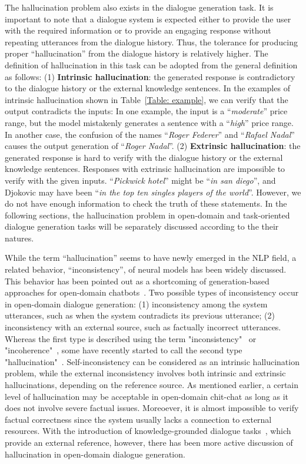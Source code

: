 The hallucination problem also exists in the dialogue generation task. It is important to note that a dialogue system is expected either to provide the user with the required information or to provide an engaging response without repeating utterances from the dialogue history. Thus, the tolerance for producing proper ``hallucination'' from the dialogue history is relatively higher.
The definition of hallucination in this task can be adopted from the general definition as follows: (1) \textbf{Intrinsic hallucination}: the generated response is contradictory to the dialogue history or the external knowledge sentences. In the examples of intrinsic hallucination shown in Table~\ref{Table: example}, we can verify that the output contradicts the inputs: In one example, the input is a ``\textit{moderate}'' price range, but the model mistakenly generates a sentence with a ``\textit{high}'' price range. In another case, the confusion of the names ``\textit{Roger Federer}'' and ``\textit{Rafael Nadal}'' causes the output generation of ``\textit{Roger Nadal}''. (2) \textbf{Extrinsic hallucination}: the generated response is hard to verify with the dialogue history or the external knowledge sentences. Responses with extrinsic hallucination are impossible to verify with the given inputs. ``\textit{Pickwick hotel}'' might be ``\textit{in san diego}'', and Djokovic may have been ``\textit{in the top ten singles players of the world}''. However, we do not have enough information to check the truth of these statements.
In the following sections, the hallucination problem in open-domain and task-oriented dialogue generation tasks will be separately discussed according to the their natures.

While the term ``hallucination'' seems to have newly emerged in the NLP field, a related behavior, ``inconsistency'', of neural models has been widely discussed. This behavior has been pointed out as a shortcoming of generation-based approaches for open-domain chatbots~. 
Two possible types of inconsistency occur in open-domain dialogue generation: (1) inconsistency among the system utterances, such as when the system contradicts its previous utterance; (2) inconsistency with an external source, such as factually incorrect utterances. Whereas the first type is described using the term "inconsistency"~ or "incoherence"~, some have recently started to call the second type "hallucination"~.  Self-inconsistency can be considered as an intrinsic hallucination problem, while the external inconsistency involves both intrinsic and extrinsic hallucinations, depending on the reference source. 
As mentioned earlier, a certain level of hallucination may be acceptable in open-domain chit-chat as long as it does not involve severe factual issues. Moreoever, it is almost impossible to verify factual correctness since the system usually lacks a connection to external resources. With the introduction of knowledge-grounded dialogue tasks~, which provide an external reference, however, there has been more active discussion of hallucination in open-domain dialogue generation.

